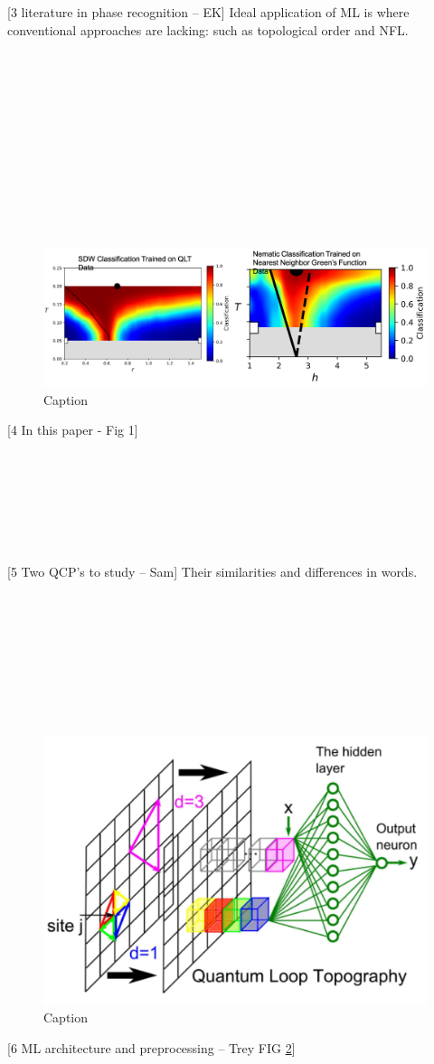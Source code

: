 \documentclass[amsmath,amssymb, aps, prx, longbibliography, twocolumn]{revtex4-1}
\begin{document}
[3 literature in phase recognition -- EK]
Ideal application of ML is where conventional approaches are lacking: such as topological order and NFL.
 \\
 \\
 \\
 \\
 \\
 \\
 \\
 \\
 \\
 \\
 \\
 \\
 \begin{figure} [t]
    \centering
\includegraphics[width=.5\textwidth]{3PT-PDs.png}
    \caption{Caption}
    \label{fig:pds}
\end{figure}
[4 In this paper - Fig 1] 
\\
\\
\\
\\
\\
\\
\\
\\


[5 Two QCP's to study -- Sam]
Their similarities and differences in words.
\\
\\
\\
\\
\\
\\
\\
\\
\\

 \begin{figure} [t]
    \centering
\includegraphics[width=.5\textwidth]{qlt.png}
    \caption{Caption}
    \label{fig:qlt}
\end{figure}
[6 ML architecture and preprocessing -- Trey FIG \ref{fig:qlt}]
\\
\\
\\
\\
\\
\\
\\
\\
\\
\\
\\
\end{document}
